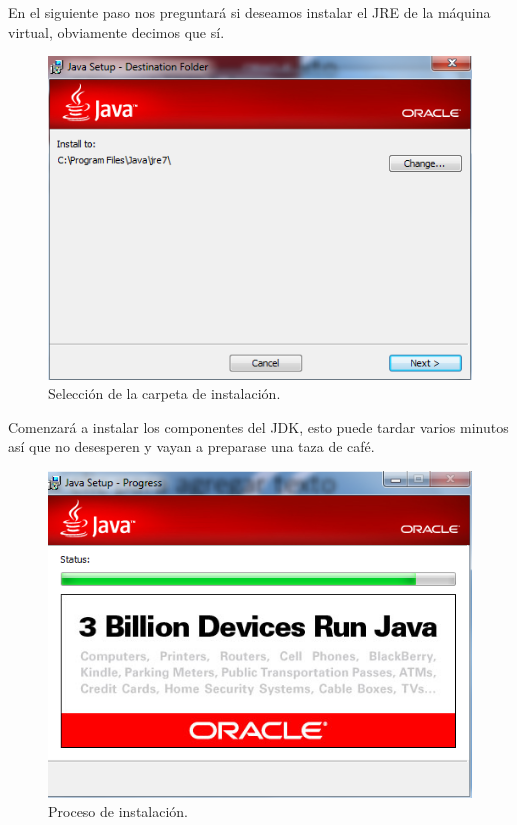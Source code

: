 En el siguiente paso nos preguntará
si deseamos instalar el JRE de la máquina virtual, obviamente decimos que sí.

\begin{figure}[H]
	\begin{center}
		\includegraphics[scale=.4]{images/instalaciones/java/img_java_7}
		\caption{Selección de la carpeta de instalación.}
	\end{center}
\end{figure} 

Comenzará a instalar los componentes del JDK, esto puede tardar
varios minutos así que no desesperen y vayan a preparase una taza de café.

\begin{figure}[H]
	\begin{center}
		\includegraphics[scale=.4]{images/instalaciones/java/img_java_8}
		\caption{Proceso de instalación.}
	\end{center}
\end{figure}

